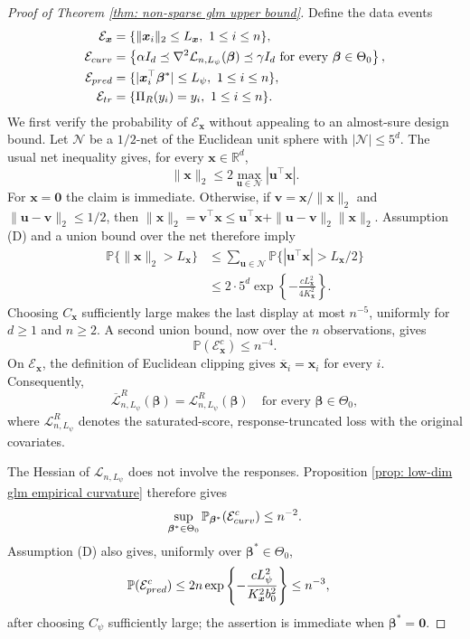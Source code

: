 \documentclass[letterpaper,12pt]{article}
\numberwithin{equation}{section}
\theoremstyle{plain}
\numberwithin{Theorem}{section}
\numberwithin{proposition}{section}
\numberwithin{Lemma}{section}
{
	\theoremstyle{definition}
	\newtheorem{Definition}{Definition}
	\newtheorem{example}{Example}
	\numberwithin{example}{section}
	\newtheorem{fact}{Fact}
	\numberwithin{fact}{section}
	\newtheorem{remark}{Remark}
}
\newcommand{\Pro}{\mathbb{P}}
\newcommand{\1}{\mathbbm{1}}
\def\bbeta{{\boldsymbol{\beta}}}
\def\Pr{\mathbb P}
\def\L{{\mathcal L}}
\begin{document}
{\begin{proof}[Proof of Theorem \ref{thm: non-sparse glm upper bound}]
	Define the data events
	\begin{align*}
	\mathcal E_{\bm x}
	&=\{\|\bm x_i\|_2\leq L_{\bm x},\ 1\leq i\leq n\},\\
	\mathcal E_{\rm curv}
	&=\left\{\alpha I_d\preceq\nabla^2\L_{n,L_\psi}(\bbeta)
		\preceq\gamma I_d\ \text{for every }\bbeta\in\Theta_0\right\},\\
	\mathcal E_{\rm pred}
	&=\{|\bm x_i^\top\bbeta^*|\leq L_\psi,\ 1\leq i\leq n\},\\
	\mathcal E_{\rm tr}
	&=\{\Pi_R(y_i)=y_i,\ 1\leq i\leq n\}.
	\end{align*}
	We first verify the probability of \(\mathcal E_{\bm x}\) without
	appealing to an almost-sure design bound.  Let \(\mathcal N\) be a
	\(1/2\)-net of the Euclidean unit sphere with
	\(|\mathcal N|\leq5^d\).  The usual net inequality gives, for every
	\(\bm x\in\mathbb R^d\),
	\[
	\|\bm x\|_2\leq2\max_{\bm u\in\mathcal N}|\bm u^\top\bm x|.
	\]
	For \(\bm x=\bm0\) the claim is immediate.  Otherwise, if
	\(\bm v=\bm x/\|\bm x\|_2\) and
	\(\|\bm u-\bm v\|_2\leq1/2\), then
	\(\|\bm x\|_2=\bm v^\top\bm x
	\leq\bm u^\top\bm x+\|\bm u-\bm v\|_2\|\bm x\|_2\).
	Assumption (D) and a union bound over the net therefore imply
	\begin{align*}
	\Pr\{\|\bm x\|_2>L_{\bm x}\}
	&\leq\sum_{\bm u\in\mathcal N}
	\Pr\{|\bm u^\top\bm x|>L_{\bm x}/2\}\\
	&\leq2\cdot5^d
	\exp\left\{-\frac{cL_{\bm x}^2}{4K_{\bm x}^2}\right\}.
	\end{align*}
	Choosing \(C_{\bm x}\) sufficiently large makes the last display at
	most \(n^{-5}\), uniformly for \(d\geq1\) and \(n\geq2\).  A second
	union bound, now over the \(n\) observations, gives
	\begin{equation}
	\Pr(\mathcal E_{\bm x}^c)\leq n^{-4}.             \label{eq: low dim no covariate clipping}
	\end{equation}
	On \(\mathcal E_{\bm x}\), the definition of Euclidean clipping gives
	\(\overline{\bm x}_i=\bm x_i\) for every \(i\). Consequently,
	\begin{equation}
	\overline\L_{n,L_\psi}^R(\bbeta)=\L_{n,L_\psi}^R(\bbeta)
	\quad\text{for every }\bbeta\in\Theta_0,          \label{eq: low dim clipped loss coupling}
	\end{equation}
	where \(\L_{n,L_\psi}^R\) denotes the saturated-score,
	response-truncated loss with the original covariates.

	The Hessian of \(\L_{n,L_\psi}\) does not involve the responses.
	Proposition
	\ref{prop: low-dim glm empirical curvature} therefore gives
	\[
	\sup_{\bbeta^*\in\Theta_0}
	\Pro_{\bbeta^*}(\mathcal E_{\rm curv}^c)\leq n^{-2}.
	\]
	Assumption (D) also gives, uniformly over
	$\bbeta^*\in\Theta_0$,
	\begin{align*}
	\Pr(\mathcal E_{\rm pred}^c)
	&\leq2n\exp\left\{
	-\frac{cL_\psi^2}{K_{\bm x}^2b_0^2}\right\}
	\leq n^{-3},
	\end{align*}
	after choosing $C_\psi$ sufficiently large; the assertion is
	immediate when $\bbeta^*=\bm0$.


\end{proof}}
\end{document}
